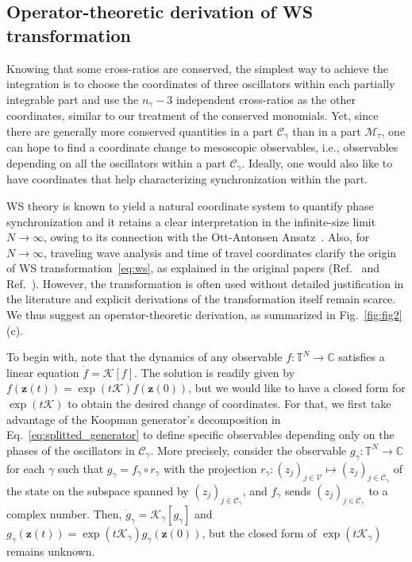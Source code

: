 \documentclass[aps,pre,reprint,longbibliography,superscriptaddress,noshowpacs,floatfix]{revtex4-2}
\theoremstyle{definition}
\theoremstyle{remark}
\begin{document}
\subsection{Operator-theoretic derivation of WS transformation}
\label{subsec:WS_derivation}

Knowing that some cross-ratios are conserved, the simplest way to achieve the integration is to choose the coordinates of three oscillators within each partially integrable part and use the $n_{\gamma} - 3$ independent cross-ratios as the other coordinates, similar to our treatment of the conserved monomials. Yet, since there are generally more conserved quantities in a part $\mathcal{C}_\gamma$ than in a part $\mathcal{M}_\tau$, one can hope to find a coordinate change to mesoscopic observables, i.e., observables depending on all the oscillators within a part $\mathcal{C}_\gamma$. Ideally, one would also like to have coordinates that help characterizing synchronization within the part.

WS theory is known to yield a natural coordinate system to quantify phase synchronization and it retains a clear interpretation in the infinite-size limit $N\to\infty$, owing to its connection with the Ott-Antonsen Ansatz~\cite{Ott2008, Pikovsky2008, Marvel2009, Pikovsky2011}. Also, for $N\to\infty$, traveling wave analysis and time of travel coordinates clarify the origin of WS transformation~\eqref{eq:ws}, as explained in the original papers (Ref.~\cite[p.2392]{Watanabe1993} and Ref.~\cite[Sec. 5.3]{Watanabe1994}). However, the transformation is often used without detailed justification in the literature and explicit derivations of the transformation itself remain scarce. We thus suggest an operator-theoretic derivation, as summarized in Fig.~\ref{fig:fig2}(c).

To begin with, note that the dynamics of any observable $f:\mathbb{T}^N \to \mathbb{C}$ satisfies a linear equation $\dot{f} = \mathcal{K}[f]$. The solution is readily given by $f(\bm{z}(t)) = \exp(t\mathcal{K})f(\bm{z}(0))$, but we would like to have a closed form for $\exp(t\mathcal{K})$ to obtain the desired change of coordinates. For that, we first take advantage of the Koopman generator’s decomposition in Eq.~\eqref{eq:splitted_generator} to define specific observables depending only on the phases of the oscillators in $\mathcal{C}_{\gamma}$. More precisely, consider the observable $g_{\gamma}:\mathbb{T}^N\to \mathbb{C}$ for each $\gamma$ such that $g_{\gamma} = f_{\gamma}\circ r_{\gamma}$ with the projection $r_{\gamma}: (z_j)_{j\in \mathcal{V}} \mapsto (z_j)_{j\in \mathcal{C}_{\gamma}}$ of the state on the subspace spanned by $(z_j)_{j\in \mathcal{C}_{\gamma}}$, and $f_{\gamma}$ sends $(z_j)_{j\in \mathcal{C}_\gamma}$ to a complex number. Then, $\dot{g}_{\gamma} = \mathcal{K}_{\gamma}[g_{\gamma}]$ and $g_{\gamma}(\bm{z}(t)) = \exp(t\mathcal{K}_\gamma)g_{\gamma}(\bm{z}(0))$, but the closed form of $\exp(t\mathcal{K}_{\gamma})$ remains unknown. 
\end{document}

